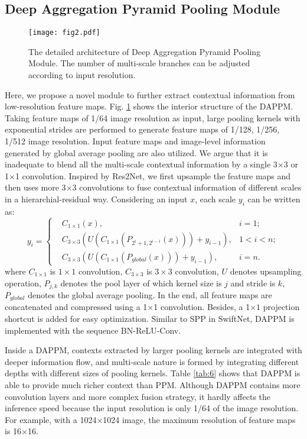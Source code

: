 \documentclass[journal]{IEEEtran}
\begin{document}
\subsection{Deep Aggregation Pyramid Pooling Module}
\label{deep}

\begin{figure}[!t]
\centerline{\texttt{[image: fig2.pdf]}}
\caption{The detailed architecture of Deep Aggregation Pyramid Pooling Module. The number of multi-scale branches can be adjusted according to input resolution.}
\label{fig2}
\end{figure}

Here, we propose a novel module to further extract contextual information from low-resolution feature maps. Fig. \ref{fig2} shows the interior structure of the DAPPM. Taking feature maps of 1/64 image resolution as input, large pooling kernels with exponential strides are performed to generate feature maps of 1/128, 1/256, 1/512 image resolution. Input feature maps and image-level information generated by global average pooling are also utilized. We argue that it is inadequate to blend all the multi-scale contextual information by a single 3$\times$3 or 1$\times$1 convolution. Inspired by Res2Net\cite{gao2019res2net}, we first upsample the feature maps and then uses more 3$\times$3 convolutions to fuse contextual information of different scales in a hierarchial-residual way. Considering an input $x$, each scale $y_i$ can be written as:
\begin{equation}
y_i=\left\{
\begin{aligned}
&C_{1\times1}(x), & i = 1 ; \\
&C_{3\times3}(U(C_{1\times1}(P_{2^i+1,2^{i-1}}(x)))+y_{i-1}), &1<i<n ; \\
&C_{3\times3}(U(C_{1\times1}(P_{global}(x)))+y_{i-1}), &i=n .
\end{aligned}
\right.
\label{eq2}
\end{equation}
where $C_{1\times1}$ is $1\times1$ convolution, $C_{3\times3}$ is $3\times3$ convolution, $U$ denotes upsampling operation, $P_{j,k}$ denotes the pool layer of which kernel size is $j$ and stride is $k$, $P_{global}$ denotes the global average pooling.
In the end, all feature maps are concatenated and compressed using a 1$\times$1 convolution. Besides, a 1$\times1$ projection shortcut is added for easy optimization. Similar to SPP in SwiftNet\cite{orsic2019defense}, DAPPM is implemented with the sequence BN-ReLU-Conv.

Inside a DAPPM, contexts extracted by larger pooling kernels are integrated with deeper information flow, and multi-scale nature is formed by integrating different depths with different sizes of pooling kernels. Table \ref{tab:6} shows that DAPPM is able to provide much richer context than PPM. Although DAPPM contains more convolution layers and more complex fusion strategy, it hardly affects the inference speed because the input resolution is only 1/64 of the image resolution. For example, with a 1024$\times$1024 image, the maximum resolution of feature maps is 16$\times$16.
\end{document}
